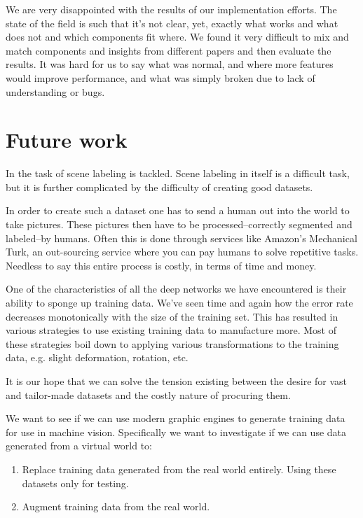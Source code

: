 \documentclass[11pt]{article}
\begin{document}
We are very disappointed with the results of our implementation efforts.  The state of the field is such that it's not clear, yet, exactly what works and what does not and which components fit where.  We found it very difficult to mix and match components and insights from different papers and then evaluate the results.  It was hard for us to say what was normal, and where more features would improve performance, and what was simply broken due to lack of understanding or bugs.

\section{Future work}

In \cite{farabet} the task of scene labeling is tackled.  Scene labeling in itself is a difficult task, but it is further complicated by the difficulty of creating good datasets.

In order to create such a dataset one has to send a human out into the world to take pictures.  These pictures then have to be processed--correctly segmented and labeled--by humans.  Often this is done through services like Amazon's Mechanical Turk, an out-sourcing service where you can pay humans to solve repetitive tasks.  Needless to say this entire process is costly, in terms of time and money.

One of the characteristics of all the deep networks we have encountered is their ability to sponge up training data.  We've seen time and again how the error rate decreases monotonically with the size of the training set.  This has resulted in various strategies to use existing training data to manufacture more.  Most of these strategies boil down to applying various transformations to the training data, e.g. slight deformation, rotation, etc.

It is our hope that we can solve the tension existing between the desire for vast and tailor-made datasets and the costly nature of procuring them.

We want to see if we can use modern graphic engines to generate training data for use in machine vision.  Specifically we want to investigate if we can use data generated from a virtual world to:

\begin{enumerate}
 \item Replace training data generated from the real world entirely.  Using these datasets only for testing.
 \item Augment training data from the real world.
\end{enumerate}
\end{document}
